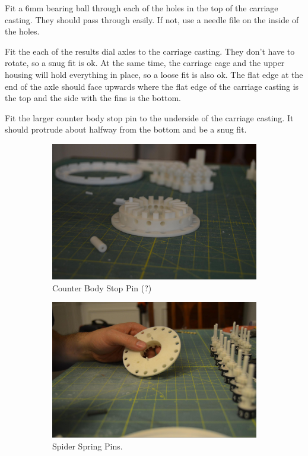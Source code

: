 \documentclass[openany]{book}
\begin{document}
Fit a 6mm bearing ball through each of the holes in the top of the carriage casting. They should pass through easily. If not, use a needle file on the inside of the holes.

Fit the each of the results dial axles to the carriage casting. They don’t have to rotate, so a snug fit is ok. At the same time, the carriage cage and the upper housing will hold everything in place, so a loose fit is also ok. The flat edge at the end of the axle should face upwards where the flat edge of the carriage casting is the top and the side with the fins is the bottom.


Fit the larger counter body stop pin to the underside of the carriage casting. It should protrude about halfway from the bottom and be a snug fit.

\begin{figure}[!ht]
	\centering
	\begin{subfigure}{.4\textwidth}
		\centering
		\includegraphics[width=.95\textwidth]{images/image53.jpg}
		\caption{Counter Body Stop Pin (?)}
		\label{fig:image53}	
	\end{subfigure}
	\begin{subfigure}{.4\textwidth}
		\centering
		\includegraphics[width=.95\textwidth]{images/image17.jpg}
		\caption{Spider Spring Pins.}
		\label{fig:image17}	
	\end{subfigure}
	\caption{}
\end{figure}
\end{document}
